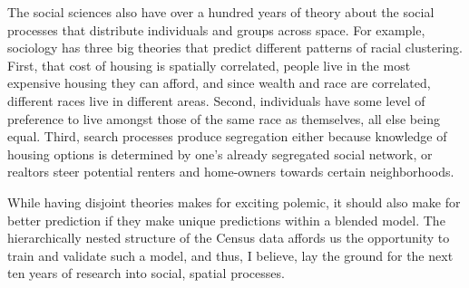 \documentclass[12pt]{article}
\begin{document}
The social sciences also have over a hundred years of theory about the
social processes that distribute individuals and groups across
space. For example, sociology has three big theories that predict
different patterns of racial clustering. First, that cost of housing
is spatially correlated, people live in the most expensive housing
they can afford, and since wealth and race are correlated, different
races live in different areas. Second, individuals have some level of
preference to live amongst those of the same race as themselves, all
else being equal. Third, search processes produce segregation either
because knowledge of housing options is determined by one's already
segregated social network, or realtors steer potential renters and
home-owners towards certain neighborhoods.

While having disjoint theories makes for exciting polemic, it should
also make for better prediction if they make unique predictions within
a blended model.  The hierarchically nested structure of the Census
data affords us the opportunity to train and validate such a model,
and thus, I believe, lay the ground for the next ten years of research
into social, spatial processes.
\end{document}
